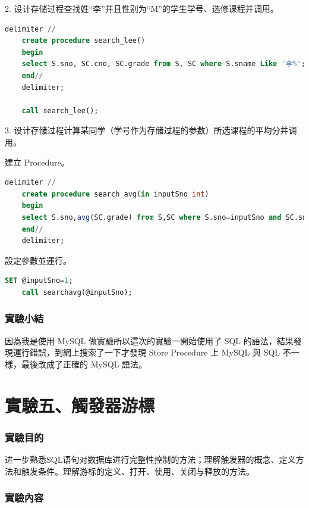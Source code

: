 \documentclass[12pt, a4paper]{report}
\begin{document}
2. 设计存储过程查找姓“李”并且性别为“M”的学生学号、选修课程并调用。

\begin{lstlisting}[language=SQL]
    delimiter //  
    create procedure search_lee()
    begin
    select S.sno, SC.cno, SC.grade from S, SC where S.sname Like '李%'; 
    end//  
    delimiter;

    call search_lee();
\end{lstlisting}

3. 设计存储过程计算某同学（学号作为存储过程的参数）所选课程的平均分并调用。

建立 Procedure。\\

\begin{lstlisting}[language=SQL]
    delimiter //  
    create procedure search_avg(in inputSno int)
    begin    
    select S.sno,avg(SC.grade) from S,SC where S.sno=inputSno and SC.sno=inputSno;
    end//  
    delimiter;
\end{lstlisting}

設定參數並運行。\\

\begin{lstlisting}[language=SQL]
    SET @inputSno=1;
    call searchavg(@inputSno);
\end{lstlisting}

\section{實驗小結}

因為我是使用 MySQL 做實驗所以這次的實驗一開始使用了 SQL 的語法，結果發現運行錯誤，到網上搜索了一下才發現 Store Procedure 上 MySQL 與 SQL 不一樣，最後改成了正確的 MySQL 語法。

\part{實驗五、觸發器游標}

\section{實驗目的}

进一步熟悉SQL语句对数据库进行完整性控制的方法；理解触发器的概念、定义方法和触发条件。理解游标的定义、打开、使用、关闭与释放的方法。

\section{實驗內容}
\end{document}
